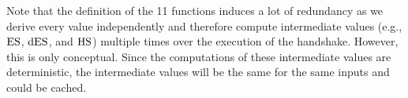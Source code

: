 Note that the definition of the 11 functions induces a lot of redundancy as we derive every value independently and therefore compute intermediate values (e.g., $\mathrm{ES}$, $\mathrm{dES}$, and $\mathrm{HS}$) multiple times over the execution of the handshake.
However, this is only conceptual.
Since the computations of these intermediate values are deterministic, the intermediate values will be the same for the same inputs and could be cached.




% 	
% 	
% 	

